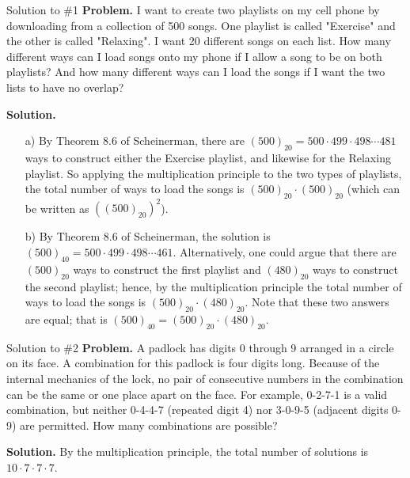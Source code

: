 \documentclass[10pt]{beamer}
\begin{document}
\begin{frame}{Solution to \#1}
\small
\textbf{Problem.} I want to create two playlists on my cell phone by downloading from a collection of 500 songs. One playlist is called "Exercise" and the other is called "Relaxing".  I want 20 different songs on each list.  How many different ways can I load songs onto my phone if I allow a song to be on both playlists?  And how many different ways can I load the songs if I want the two lists to have no overlap? 

\vfill 

\textbf{Solution.}
\begin{itemize}
\item[a)] By Theorem 8.6 of Scheinerman, there are $(500)_{20} = 500 \cdot 499 \cdot 498 \cdots 481$ ways to construct either the Exercise playlist, and likewise for the Relaxing playlist.  So applying the multiplication principle to the two types of playlists, the total number of ways to load the songs is $(500)_{20} \cdot (500)_{20}$ (which can be written as $((500)_{20})^2$).
\item[b)] By Theorem 8.6 of Scheinerman, the solution is $(500)_{40} = 500 \cdot 499 \cdot 498 \cdots 461$.  Alternatively, one could argue that there are $(500)_{20}$ ways to construct the first playlist and $(480)_{20}$ ways to construct the second playlist; hence, by the multiplication principle the total number of ways to load the songs is  $(500)_{20} \cdot (480)_{20}$. Note that these two answers are equal; that is  $(500)_{40} = (500)_{20} \cdot (480)_{20}$.
\end{itemize}

% 
\end{frame}



\begin{frame}{Solution to \#2}
\textbf{Problem.} A padlock has digits 0 through 9 arranged in a circle on its face. A combination for this padlock is four digits long. Because of the internal mechanics of the lock, no pair of consecutive numbers in the combination can be the same or one place apart on the face.  For example, 0-2-7-1 is a valid combination, but neither 0-4-4-7 (repeated digit 4) nor 3-0-9-5 (adjacent digits 0-9) are permitted.  How many combinations are possible?

\vfill 

\textbf{Solution.}  By the multiplication principle, the total number of solutions is $10 \cdot 7 \cdot 7 \cdot 7$.

\end{frame}
\end{document}
